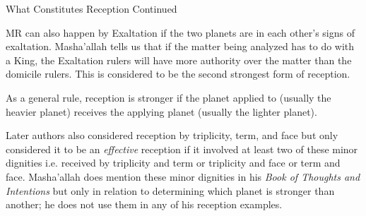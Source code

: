 \begin{frame}[t]{What Constitutes Reception Continued}

MR can also happen by Exaltation if the two planets are in each other's signs of exaltation. Masha'allah tells us that if the matter being analyzed has to do with a King, the Exaltation rulers will have more authority over the matter than the domicile rulers. This is considered to be the second strongest form of  reception.

As a general rule, reception is stronger if the planet applied to (usually the heavier planet) receives the applying planet (usually the lighter planet).

Later authors also considered reception by triplicity, term, and face but only considered it to be an \textsl{effective} reception if it involved at least two of these minor dignities i.e. received by triplicity and term or triplicity and face or term and face. Masha'allah does mention these minor dignities in his \textsl{Book of Thoughts and Intentions} but only in relation to determining which planet is stronger than another; he does not use them in any of his reception examples.

\end{frame}